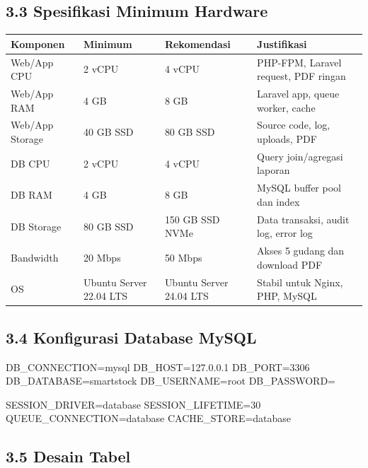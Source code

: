 \documentclass[
]{article}
\newenvironment{Shaded}{}{}
\newcommand{\NormalTok}[1]{#1}
\begin{document}
\subsection{3.3 Spesifikasi Minimum
Hardware}\label{33-spesifikasi-minimum-hardware}

\begin{longtable}[]{@{}P{0.15\textwidth}P{0.22\textwidth}P{0.18\textwidth}P{0.39\textwidth}@{}}
\toprule\noalign{}
Komponen & Minimum & Rekomendasi & Justifikasi \\
\midrule\noalign{}
\endhead
\bottomrule\noalign{}
\endlastfoot
Web/App CPU & 2 vCPU & 4 vCPU & PHP-FPM, Laravel request, PDF ringan \\
Web/App RAM & 4 GB & 8 GB & Laravel app, queue worker, cache \\
Web/App Storage & 40 GB SSD & 80 GB SSD & Source code, log, uploads,
PDF \\
DB CPU & 2 vCPU & 4 vCPU & Query join/agregasi laporan \\
DB RAM & 4 GB & 8 GB & MySQL buffer pool dan index \\
DB Storage & 80 GB SSD & 150 GB SSD NVMe & Data transaksi, audit log,
error log \\
Bandwidth & 20 Mbps & 50 Mbps & Akses 5 gudang dan download PDF \\
OS & Ubuntu Server 22.04 LTS & Ubuntu Server 24.04 LTS & Stabil untuk
Nginx, PHP, MySQL \\
\end{longtable}

\subsection{3.4 Konfigurasi Database
MySQL}\label{34-konfigurasi-database-mysql}

\begin{Shaded}
\begin{Highlighting}[]
\NormalTok{DB\_CONNECTION=mysql}
\NormalTok{DB\_HOST=127.0.0.1}
\NormalTok{DB\_PORT=3306}
\NormalTok{DB\_DATABASE=smartstock}
\NormalTok{DB\_USERNAME=root}
\NormalTok{DB\_PASSWORD=}

\NormalTok{SESSION\_DRIVER=database}
\NormalTok{SESSION\_LIFETIME=30}
\NormalTok{QUEUE\_CONNECTION=database}
\NormalTok{CACHE\_STORE=database}
\end{Highlighting}
\end{Shaded}

\subsection{3.5 Desain Tabel}\label{35-desain-tabel}
\end{document}
